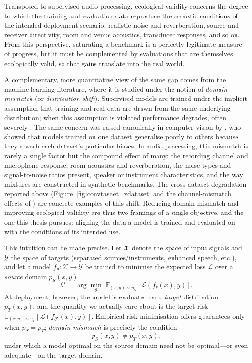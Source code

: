 Transposed to supervised audio processing, ecological validity concerns the
degree to which the training and evaluation data reproduce
the acoustic conditions of the intended deployment scenario: realistic noise
and reverberation, source and receiver directivity, room and venue acoustics,
transducer responses, and so on. From this perspective, saturating a benchmark
is a perfectly legitimate measure of progress, but it must be complemented by
evaluations that are themselves ecologically valid, so that gains
translate into the real world.

A complementary, more quantitative view of the same gap comes from the machine
learning literature, where it is studied under the notion of \emph{domain
mismatch} (or \emph{distribution shift}). Supervised models are trained under the
implicit assumption that training and real data are drawn from the same underlying distribution; when this assumption is violated performance degrades, often severely \citep{quinonero2008dataset}. The same concern was raised canonically in computer vision by \citet{torralba2011unbiased}, who showed that models trained on one dataset generalise poorly to others because they absorb each dataset's particular biases. In audio processing, this mismatch is rarely a single
factor but the compound effect of many: the recording channel and microphone
response, room acoustics and reverberation, the noise types and signal-to-noise
ratios present, speaker or instrument characteristics, and the way mixtures are
constructed in synthetic benchmarks. The cross-dataset degradation reported above
(Figure~\ref{fig:convtasnet_xdataset} and the channel-mismatch effects of
\citealp{pandey2020crosscorpus}) are concrete examples of this shift. Reducing domain mismatch and improving ecological validity are thus two
framings of a single objective, and the one this thesis pursues: aligning the
data a model is trained and evaluated on with the conditions of its intended use.

This intuition can be made precise. Let $\mathcal{X}$ denote the space of input
signals and $\mathcal{Y}$ the space of targets (separated sources/instruments, enhanced speech,
etc.), and let a model $f_\theta : \mathcal{X} \rightarrow \mathcal{Y}$ be trained
to minimise the expected loss $\mathcal{L}$ over a \emph{source} domain
$p_S(x, y)$:
\begin{equation}
    \theta^\star = \arg\min_\theta \;
    \mathbb{E}_{(x,y)\sim p_S}\!\left[\mathcal{L}\!\left(f_\theta(x), y\right)\right].
    \label{eq:erm}
\end{equation}
At deployment, however, the model is evaluated on a \emph{target} distribution
$p_T(x, y)$, and the quantity we actually care about is the target risk
$\mathbb{E}_{(x,y)\sim p_T}[\mathcal{L}(f_{\theta^\star}(x), y)]$. Empirical risk
minimisation offers guarantees only when $p_S = p_T$; \emph{domain mismatch} is
precisely the condition
\begin{equation}
    p_S(x, y) \neq p_T(x, y),
    \label{eq:mismatch}
\end{equation}
under which a model optimal on the source domain need not be optimal---or even
adequate---on the target domain. 

